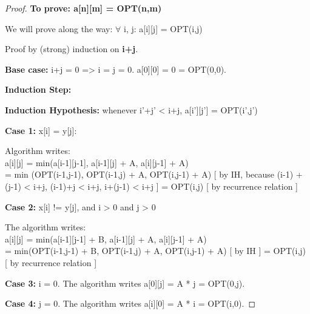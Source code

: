\documentclass[openany]{article}
\begin{document}
\begin{proof}{}{}
\textbf{To prove: a[n][m] = OPT(n,m)}

We will prove along the way: $\forall$ i, j: a[i][j] = OPT(i,j)

Proof by (strong) induction on \textbf{i+j}.

\textbf{Base case:} i+j = 0 => i = j = 0. a[0][0] = 0 = OPT(0,0).

\textbf{Induction Step:}

\textbf{Induction Hypothesis:} whenever i'+j' < i+j, a[i'][j'] = OPT(i',j')

\qquad \textbf{Case 1:} x[i] = y[j]:

Algorithm writes:\\ a[i][j] = min(a[i-1][j-1], a[i-1][j] + A, a[i][j-1] + A)\\= min (OPT(i-1,j-1), OPT(i-1,j) + A, OPT(i,j-1) + A)
[ by IH, because (i-1) + (j-1) < i+j, (i-1)+j < i+j, i+(j-1) < i+j ] = OPT(i,j) [ by recurrence relation ]

\qquad \textbf{Case 2:} x[i] != y[j], and i > 0 and j > 0

The algorithm writes:\\a[i][j] = min(a[i-1][j-1] + B, a[i-1][j] + A, a[i][j-1] + A) \\= min(OPT(i-1,j-1) + B, OPT(i-1,j) + A, OPT(i,j-1) + A) [ by IH ]
= OPT(i,j) [ by recurrence relation ]

\qquad \textbf{Case 3:} i = 0. The algorithm writes a[0][j] = A * j = OPT(0,j).

\qquad \textbf{Case 4:} j = 0. The algorithm writes a[i][0] = A * i = OPT(i,0).

\end{proof}
    

        
\end{document}
